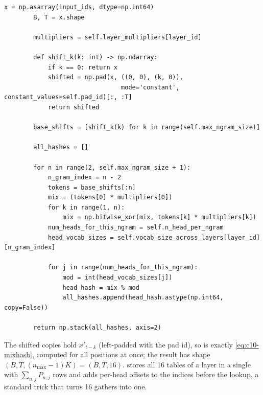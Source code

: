 \begin{lstlisting}[caption={Excerpt from \texttt{repos/deepseek-ai\_\_Engram/engram\_demo\_v1.py} (\texttt{NgramHashMapping.\_get\_ngram\_hashes}).},label={lst:c10-engram-hash}]
        x = np.asarray(input_ids, dtype=np.int64)
        B, T = x.shape

        multipliers = self.layer_multipliers[layer_id]

        def shift_k(k: int) -> np.ndarray:
            if k == 0: return x
            shifted = np.pad(x, ((0, 0), (k, 0)),
                                mode='constant', constant_values=self.pad_id)[:, :T]
            return shifted

        base_shifts = [shift_k(k) for k in range(self.max_ngram_size)]

        all_hashes = []

        for n in range(2, self.max_ngram_size + 1):
            n_gram_index = n - 2
            tokens = base_shifts[:n]
            mix = (tokens[0] * multipliers[0])
            for k in range(1, n):
                mix = np.bitwise_xor(mix, tokens[k] * multipliers[k])
            num_heads_for_this_ngram = self.n_head_per_ngram
            head_vocab_sizes = self.vocab_size_across_layers[layer_id][n_gram_index]

            for j in range(num_heads_for_this_ngram):
                mod = int(head_vocab_sizes[j])
                head_hash = mix % mod
                all_hashes.append(head_hash.astype(np.int64, copy=False))

        return np.stack(all_hashes, axis=2)
\end{lstlisting}

The shifted copies  hold $x'_{t-k}$ (left-padded with the pad id), so
 is exactly \cref{eq:c10-mixhash}, computed for all positions at once; the result has
shape $(B, T, (n_{\max}-1)K) = (B, T, 16)$.  stores all 16 tables of a
layer in a single  with $\sum_{n,j} P_{n,j}$ rows and adds per-head offsets to the
indices before the lookup, a standard trick that turns 16 gathers into one.

